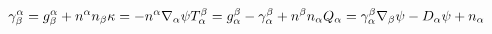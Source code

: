 \documentclass[landscape,letterpaper,10pt,english]{article}
\newcommand{\prompt}[4]{
        {\ttfamily\llap{{\color{#2}[#3]:\hspace{3pt}#4}}\vspace{-\baselineskip}}
    }
\begin{document}
            
\prompt{Out}{outcolor}{35}{}
    
    \[

\gamma^\alpha_\beta = g^\alpha_\beta + n^\alpha n_\beta \\

\kappa = -n^\alpha \nabla_\alpha \psi \\

T^\beta_\alpha = g^\beta_\alpha - \gamma^\beta_\alpha + n^\beta n_\alpha \\
Q_\alpha = \gamma^\beta_\alpha \nabla_\beta \psi - D_\alpha \psi + n_\alpha \\

\]

    
\end{document}
